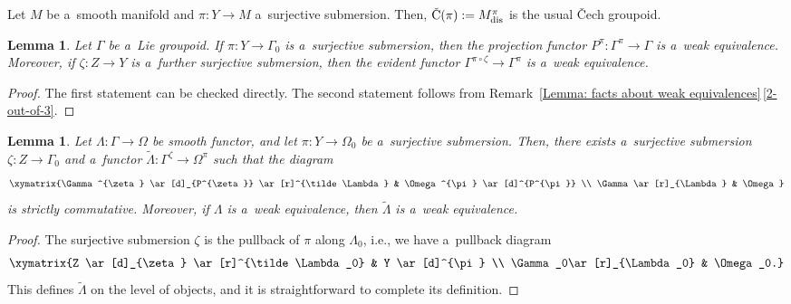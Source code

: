 \documentclass[10pt,a4paper]{amsart}
\numberwithin{equation}{section}
\newtheorem{Lemma}[Theorem]{Lemma}
\newcommand{\alxydim}[2]{\begin{aligned}\xymatrix#1{#2}\end{aligned}}
\begin{document}
\begin{Example}\label{Example : Cech groupoid and weak equivalences}
 Let $M$ be a~smooth manifold and $\pi\colon Y \to M$ a~surjective submersion. Then, $\text{\v C}(\pi):=M_{\rm dis}^{\pi}$ is the usual \v Cech groupoid.
\end{Example}

\begin{Lemma}
Let $\Gamma$ be a~Lie groupoid. If $\pi\colon Y \to \Gamma_0$ is a~surjective submersion, then the projection functor $P^{\pi}\colon \Gamma^{\pi} \to \Gamma$ is a~weak equivalence. Moreover, if $\zeta\colon Z \to Y$ is a~further surjective submersion, then the evident functor $\Gamma^{\pi \circ \zeta} \to \Gamma^{\pi}$ is a~weak equivalence.
\end{Lemma}

\begin{proof}
The first statement can be checked directly. The second statement follows from Remark~\ref{Lemma: facts about weak equivalences}\,\ref{2-out-of-3}.
\end{proof}

\begin{Lemma}
\label{pullback-of-coverings}
Let $\Lambda\colon \Gamma \to \Omega$ be smooth functor, and let $\pi\colon Y \to \Omega_0$ be a~surjective submersion. Then, there exists a~surjective submersion $\zeta\colon Z \to \Gamma_0$ and a~functor $\tilde\Lambda\colon \Gamma^{\zeta} \to \Omega^{\pi}$ such that the diagram
\begin{equation*}
\alxydim{}{\Gamma^{\zeta} \ar[d]_{P^{\zeta}} \ar[r]^{\tilde\Lambda} & \Omega^{\pi} \ar[d]^{P^{\pi}} \\ \Gamma \ar[r]_{\Lambda} & \Omega}
\end{equation*}
is strictly commutative. Moreover, if $\Lambda$ is a~weak equivalence, then $\tilde\Lambda$ is a~weak equivalence.
\end{Lemma}
\begin{proof}
The surjective submersion $\zeta$ is the pullback of $\pi$ along $\Lambda_0$, i.e., we have a~pullback diagram
\begin{equation*}
\alxydim{}{Z \ar[d]_{\zeta} \ar[r]^{\tilde\Lambda_0} & Y \ar[d]^{\pi} \\ \Gamma_0\ar[r]_{\Lambda_0} & \Omega_0.}
\end{equation*}
This defines $\tilde\Lambda$ on the level of objects, and it is straightforward to complete its definition.
\end{proof}
\end{document}
